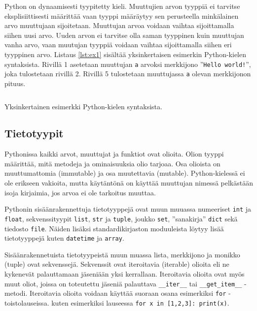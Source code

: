 \documentclass[finnish]{tktltiki2}
\theoremstyle{definition}
\theoremstyle{remark}
\begin{document}
Python on dynaamisesti tyypitetty kieli. Muuttujien arvon tyyppiä ei tarvitse eksplisiittisesti määrittää vaan tyyppi määräytyy sen perusteella minkälainen arvo muuttujaan sijoitetaan. Muuttujan arvoa voidaan vaihtaa sijoittamalla siihen uusi arvo. Uuden arvon ei tarvitse olla saman tyyppinen kuin muuttujan vanha arvo, vaan muutujan tyyppiä voidaan vaihtaa sijoittamalla siihen eri tyyppinen arvo. Listaus \ref{lst:ex1} sisältää yksinkertaisen esimerkin Python-kielen syntaksista. Rivillä 1 asetetaan muuttujan \verb|a| arvoksi merkkijono ''\verb|Hello world!|'', joka tulostetaan rivillä 2. Rivillä 5 tulostetaan muuttujassa \verb|a| olevan merkkijonon pituus.


\begin{listing}
    \inputminted[linenos]{python}{code/foo.py}
    \caption{Yksinkertainen esimerkki Python-kielen syntaksista.}
    \label{lst:ex1}
\end{listing}

\subsection{Tietotyypit}

Pythonissa kaikki arvot, muuttujat ja funktiot ovat olioita. Olion tyyppi määrittää, mitä metodeja ja ominaisuuksia olio tarjoaa. Osa olioista on muuttumattomia (immutable) ja osa muutettavia (mutable). Python-kielessä ei ole erikseen vakioita, mutta käytäntönä on käyttää muuttujan nimessä pelkästään isoja kirjaimia, jos arvoa ei ole tarkoitus muuttaa.

Pythonin sisäänrakennettuja tietotyyppejä ovat muun muuassa numeeriset \verb|int| ja \verb|float|, sekvenssityypit \verb|list|, \verb|str| ja \verb|tuple|, joukko \verb|set|, ''sanakirja'' \verb|dict| sekä tiedosto \verb|file|. Näiden lisäksi standardikirjaston moduuleista löytyy lisää tietotyyppejä kuten \verb|datetime| ja \verb|array|.

Sisäänrakennetuista tietotyypeistä muun muassa lista, merkkijono ja monikko (tuple) ovat sekvenssejä. Sekvenssit ovat iteroitavia (iterable) olioita eli ne kykenevät palauttamaan jäseniään yksi kerrallaan. Iteroitavia olioita ovat myös muut oliot, joissa on toteutettu jäseniä palauttava \verb|__iter__| tai \verb|__get_item__| -metodi. Iteroitavia olioita voidaan käyttää suoraan osana esimerkiksi \verb|for| -toistolauseissa. kuten esimerkiksi lauseessa \lstinline|for x in [1,2,3]: print(x)|.
\end{document}
